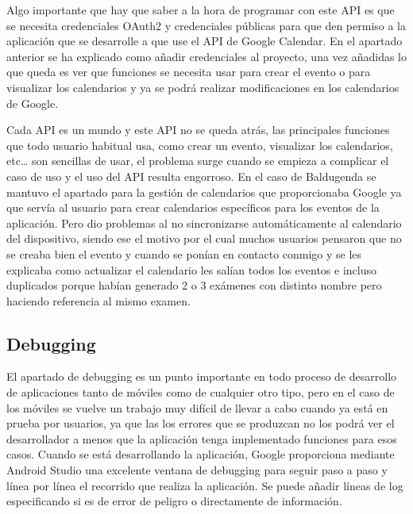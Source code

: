 Algo importante que hay que saber a la hora de programar con este API es que se necesita credenciales OAuth2 y credenciales públicas para que den permiso a la aplicación que se desarrolle a que use el API de Google Calendar.
En el apartado anterior se ha explicado como añadir credenciales al proyecto, una vez añadidas lo que queda es ver que funciones se necesita usar para crear el evento o para visualizar los calendarios y ya se podrá realizar modificaciones en los calendarios de Google.

Cada API es un mundo y este API no se queda atrás, las principales funciones que todo usuario habitual usa, como crear un evento, visualizar los calendarios, etc… son sencillas de usar, el problema surge cuando se empieza a complicar el caso de uso y el uso del API resulta engorroso.
En el caso de Baldugenda se mantuvo el apartado para la gestión de calendarios que proporcionaba Google ya que servía al usuario para crear calendarios específicos para los eventos de la aplicación. Pero dio problemas al no sincronizarse automáticamente al calendario del dispositivo, siendo ese el motivo por el cual muchos usuarios pensaron que no se creaba bien el evento y cuando se ponían en contacto conmigo y se les explicaba como actualizar el calendario les salían todos los eventos e incluso duplicados porque habían generado 2 o 3 exámenes con distinto nombre pero haciendo referencia al mismo examen.

\subsection{Debugging}
\label{subsecc:Debugging}

El apartado de debugging es un punto importante en todo proceso de desarrollo de aplicaciones tanto de móviles como de cualquier otro tipo, pero en el caso de los móviles se vuelve un trabajo muy difícil de llevar a cabo cuando ya está en prueba por usuarios, ya que las los errores que se produzcan no los podrá ver el desarrollador a menos que la aplicación tenga implementado funciones para esos casos.
Cuando se está desarrollando la aplicación, Google proporciona mediante Android Studio una excelente ventana de debugging para seguir paso a paso y  línea por línea el recorrido que realiza la aplicación.
Se puede añadir líneas de log especificando si es de error de peligro o directamente de información. 


